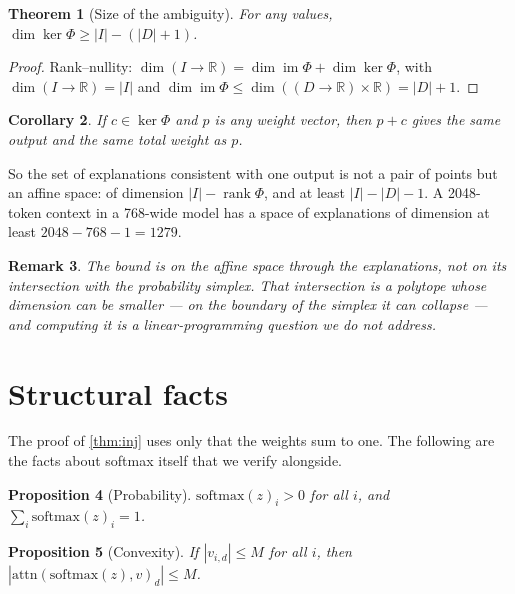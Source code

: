 \documentclass[11pt]{article}
\newtheorem{theorem}{Theorem}
\newtheorem{proposition}[theorem]{Proposition}
\newtheorem{corollary}[theorem]{Corollary}
\newtheorem{remark}[theorem]{Remark}
\newcommand{\R}{\mathbb{R}}
\begin{document}
\begin{theorem}[Size of the ambiguity]\label{thm:kerdim}
For any values, $\dim \ker \Phi \ge |I| - (|D| + 1)$.
\end{theorem}

\begin{proof}
Rank--nullity: $\dim(I\to\R) = \dim \operatorname{im}\Phi + \dim \ker \Phi$,
with $\dim (I\to\R) = |I|$ and $\dim \operatorname{im}\Phi \le \dim((D\to\R)\times\R) = |D|+1$.
\end{proof}

\begin{corollary}\label{cor:fiber}
If $c \in \ker \Phi$ and $p$ is any weight vector, then $p + c$ gives the same
output and the same total weight as $p$.
\end{corollary}

So the set of explanations consistent with one output is not a pair of points
but an affine space: of dimension $|I| - \operatorname{rank}\Phi$, and at least
$|I| - |D| - 1$. A 2048-token context in a 768-wide model has a space of
explanations of dimension at least $2048 - 768 - 1 = 1279$.

\begin{remark}
The bound is on the affine space through the explanations, not on its
intersection with the probability simplex. That intersection is a polytope whose
dimension can be smaller --- on the boundary of the simplex it can collapse ---
and computing it is a linear-programming question we do not address.
\end{remark}

\section{Structural facts}\label{sec:structure}

The proof of \cref{thm:inj} uses only that the weights sum to one. The
following are the facts about softmax itself that we verify alongside.

\begin{proposition}[Probability]\label{prop:prob}
$\mathrm{softmax}(z)_i > 0$ for all $i$, and $\sum_i \mathrm{softmax}(z)_i = 1$.
\end{proposition}

\begin{proposition}[Convexity]\label{prop:conv}
If $|v_{i,d}| \le M$ for all $i$, then
$|\mathrm{attn}(\mathrm{softmax}(z),v)_d| \le M$.
\end{proposition}
\end{document}

